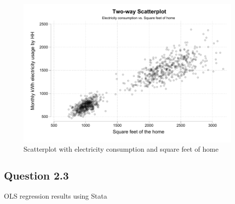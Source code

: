 \documentclass{article}
\begin{document}
\begin{figure}[ht]
    \centering
    \includegraphics[scale = 0.7]{homework 2/output/figure/scatterplot.pdf}
    \caption{Scatterplot with electricity consumption and square feet of home}
\end{figure}

\subsection*{Question 2.3}
\begin{table}[ht]
    \centering
    
    \caption{OLS regression results using Stata}
  \end{table}
\end{document}

